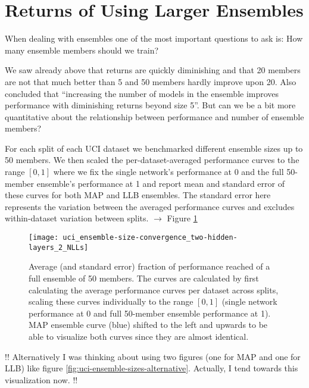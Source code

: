 \documentclass[../thesis.tex]{subfiles}
\begin{document}
\section{Returns of Using Larger Ensembles}
When dealing with ensembles one of the most important questions to ask is: How many ensemble members should we train? 


We saw already above that returns are quickly diminishing and that 20 members are not that much better than 5 and 50 members hardly improve upon 20. Also \textcite{ovadia2019can} concluded that ``increasing the number of models in the ensemble improves performance with diminishing returns beyond size 5''.
But can we be a bit more quantitative about the relationship between performance and number of ensemble members?
\bigskip

For each split of each UCI dataset we benchmarked different ensemble sizes up to 50 members. We then scaled the per-dataset-averaged performance curves to the range $[0, 1]$ where we fix the single network's performance at 0 and the full 50-member ensemble's performance at 1 and report mean and standard error of these curves for both MAP and LLB ensembles. The standard error here represents the variation between the averaged performance curves and excludes within-dataset variation between splits. $\rightarrow$ Figure \ref{fig:uci-ensemble-sizes}
\bigskip

\begin{figure}
    \centering
    \texttt{[image: uci\_ensemble-size-convergence\_two-hidden-layers\_2\_NLLs]} 
    \caption{Average (and standard error) fraction of performance reached of a full ensemble of 50 members. The curves are calculated by first calculating the average performance curves per dataset across splits, scaling these curves individually to the range $[0, 1]$ (single network performance at 0 and full 50-member ensemble performance at 1). MAP ensemble curve (blue) shifted to the left and upwards to be able to visualize both curves since they are almost identical.}
    \label{fig:uci-ensemble-sizes}
\end{figure}

!! Alternatively I was thinking about using two figures (one for MAP and one for LLB) like figure \ref{fig:uci-ensemble-sizes-alternative}. Actually, I tend towards this visualization now. !!
\end{document}
